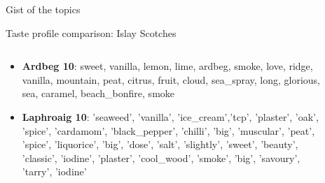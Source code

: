 \documentclass{beamer}
\begin{document}
\begin{frame}{Gist of the topics}
	
\end{frame}

	\begin{frame}{Taste profile comparison: Islay Scotches}
		\fontsize{8pt}{8pt}\selectfont
		
			\begin{columns}
		\begin{column}{0.4\textwidth}
				\begin{itemize}
				\item \textbf{Ardbeg 10}: sweet, vanilla, lemon, lime, ardbeg, smoke, love, ridge, vanilla, mountain, peat, citrus, fruit, cloud, sea\_spray, long, glorious, sea, caramel, beach\_bonfire, smoke
				\item \textbf{Laphroaig 10}: 'seaweed', 'vanilla', 'ice\_cream','tcp', 'plaster', 'oak', 'spice', 'cardamom', 'black\_pepper', 'chilli', 'big', 'muscular', 'peat', 'spice', 'liquorice', 'big', 'dose', 'salt', 'slightly', 'sweet', 'beauty', 'classic', 'iodine', 'plaster', 'cool\_wood', 'smoke', 'big', 'savoury', 'tarry', 'iodine'
			\end{itemize}
		\end{column}
		\begin{column}{0.6\textwidth}
			\begin{figure}[H]
				\begin{center}

\end{center}
\end{figure}
\end{column}
\end{columns}
\end{frame}
\end{document}
